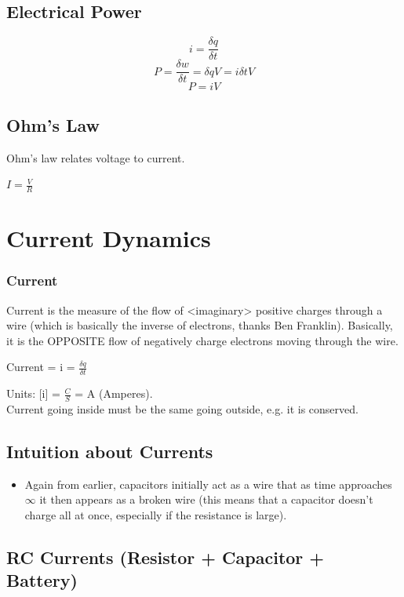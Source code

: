\documentclass{article}
\begin{document}
\subsection{Electrical Power}

$$i = \frac{\delta q}{\delta t}$$
$$P = \frac{\delta w}{\delta t} = \delta q V = i \delta t V $$
$$P = iV$$

\subsection{Ohm's Law}

Ohm's law relates voltage to current.

$I = \frac{V}{R}$

\section{Current Dynamics}

\subsubsection{Current}

Current is the measure of the flow of <imaginary> positive charges through a wire (which is basically the inverse of electrons, thanks Ben Franklin). Basically, it is the OPPOSITE flow of negatively charge electrons moving through the wire.

Current = i = $\frac{\delta q}{\delta t}$

Units: [i] = $\frac{C}{S}$ = A (Amperes). \\
Current going inside must be the same going outside, e.g. it is conserved.

\subsection{Intuition about Currents}

\begin{itemize}
    \item Again from earlier, capacitors initially act as a wire that as time approaches $\infty$ it then appears as a broken wire (this means that a capacitor doesn't charge all at once, especially if the resistance is large).
\end{itemize}

\subsection{RC Currents (Resistor + Capacitor + Battery)}
\end{document}

